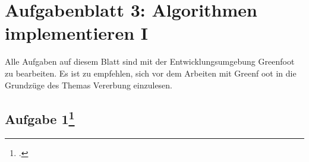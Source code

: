 \documentclass{lehramt-informatik-haupt}
\begin{document}
\chapter{Aufgabenblatt 3: Algorithmen implementieren I}

Alle Aufgaben auf diesem Blatt sind mit der Entwicklungsumgebung
Greenfoot zu bearbeiten. Es ist zu empfehlen, sich vor dem Arbeiten mit
Greenf oot in die Grundzüge des Themas Vererbung einzulesen.

%

\section{Aufgabe 1\footcite{oomup:ab:3}}
\end{document}
